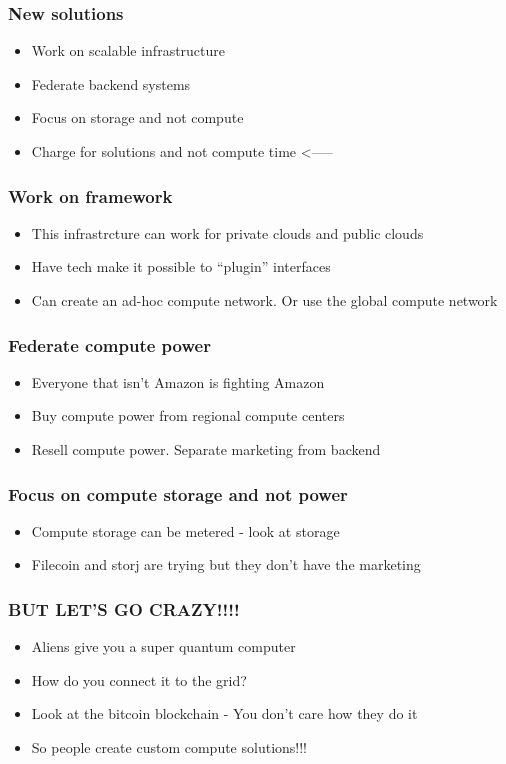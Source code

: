 \documentclass{beamer}
\begin{document}
\begin{frame}
  \frametitle{New solutions}
  \begin{itemize}
    \item Work on scalable infrastructure
    \item Federate backend systems
    \item Focus on storage and not compute
    \item Charge for solutions and not compute time <-----
  \end{itemize}
\end{frame}

\begin{frame}
  \frametitle{Work on framework}
  \begin{itemize}
    \item This infrastrcture can work for private clouds and public
      clouds
    \item Have tech make it possible to ``plugin'' interfaces
    \item Can create an ad-hoc compute network.  Or use the global
      compute network
  \end{itemize}
\end{frame}

\begin{frame}
  \frametitle{Federate compute power}
  \begin{itemize}
    \item Everyone that isn't Amazon is fighting Amazon
    \item Buy compute power from regional compute centers
    \item Resell compute power.  Separate marketing from backend
  \end{itemize}
\end{frame}

\begin{frame}
  \frametitle{Focus on compute storage and not power}
  \begin{itemize}
  \item Compute storage can be metered - look at storage
  \item Filecoin and storj are trying but they don't have the marketing
  \end{itemize}
\end{frame}

\begin{frame}
  \frametitle{BUT LET'S GO CRAZY!!!!}
  \begin{itemize}
  \item Aliens give you a super quantum computer
  \item How do you connect it to the grid?
  \item Look at the bitcoin blockchain - You don't care how they do it
  \item So people create custom compute solutions!!!
  \end{itemize}
\end{frame}
\end{document}
